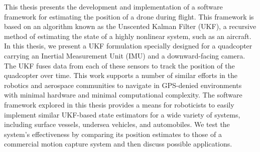 This thesis presents the development and implementation of a software framework for estimating the position of a drone during flight. This framework is based on an algorithm known as the Unscented Kalman Filter (UKF), a recursive method of estimating the state of a highly nonlinear system, such as an aircraft. In this thesis, we present a UKF formulation specially designed for a quadcopter carrying an Inertial Measurement Unit (IMU) and a downward-facing camera. The UKF fuses data from each of these sensors to track the position of the quadcopter over time. This work supports a number of similar efforts in the robotics and aerospace communities to navigate in GPS-denied environments with minimal hardware and minimal computational complexity. The software framework explored in this thesis provides a means for roboticists to easily implement similar UKF-based state estimators for a wide variety of systems, including surface vessels, undersea vehicles, and automobiles. We test the system's effectiveness by comparing its position estimates to those of a commercial motion capture system and then discuss possible applications.

\thispagestyle{empty}

